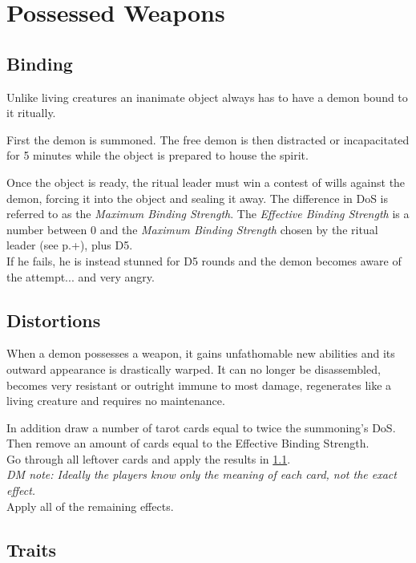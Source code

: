 \section{Possessed Weapons}
\label{sec:possessedweapon}
\subsection*{Binding}
Unlike living creatures an inanimate object always has to have a demon bound to it ritually.
\par
First the demon is summoned.
The free demon is then distracted or incapacitated for 5 minutes while the object is prepared to house the spirit.
\par
Once the object is ready, the ritual leader must win a contest of wills against the demon, forcing it into the object and sealing it away.
The difference in DoS is referred to as the \emph{Maximum Binding Strength}.
The \emph{Effective Binding Strength} is a number between 0 and the \emph{Maximum Binding Strength} chosen by the ritual leader (see p.\pageref{ch:rituals}+), plus D5.\\
If he fails, he is instead stunned for D5 rounds and the demon becomes aware of the attempt... and very angry.

\subsection*{Distortions}
When a demon possesses a weapon, it gains unfathomable new abilities and its outward appearance is drastically warped.
It can no longer be disassembled, becomes very resistant or outright immune to most damage, regenerates like a living creature and requires no maintenance.
\par
In addition draw a number of tarot cards equal to twice the summoning's DoS.
Then remove an amount of cards equal to the Effective Binding Strength.\\
Go through all leftover cards and apply the results in \ref{sec:traits}.
\\%
\emph{DM note: Ideally the players know only the meaning of each card, not the exact effect.}
\\%
Apply all of the remaining effects.

\subsection{Traits}
\label{sec:traits}
